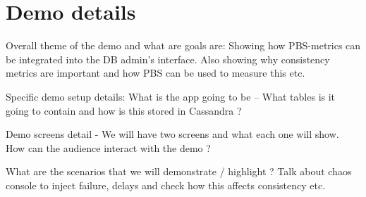\section{Demo details}
\label{sec:demo}

Overall theme of the demo and what are goals are: Showing how PBS-metrics can be
integrated into the DB admin's interface. Also showing why consistency metrics
are important and how PBS can be used to measure this etc.

Specific demo setup details: What is the app going to be -- What tables is it
going to contain and how is this stored in Cassandra ?

Demo screens detail - We will have two screens and what each one will show. How
can the audience interact with the demo ?

What are the scenarios that we will demonstrate / highlight ? Talk about chaos
console to inject failure, delays and check how this affects consistency etc.
